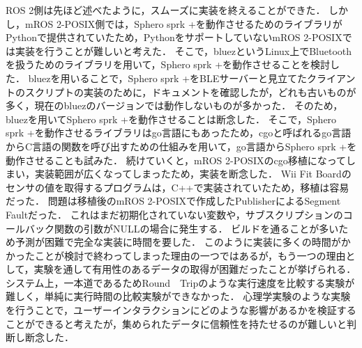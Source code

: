 ROS 2側は先ほど述べたように，スムーズに実装を終えることができた．
しかし，mROS 2-POSIX側では，Sphero sprk +を動作させるためのライブラリがPythonで提供されていたため，PythonをサポートしていないmROS 2-POSIXでは実装を行うことが難しいと考えた．
そこで，bluezというLinux上でBluetoothを扱うためのライブラリを用いて，Sphero sprk +を動作させることを検討した．
bluezを用いることで，Sphero sprk +をBLEサーバーと見立てたクライアントのスクリプトの実装のために，ドキュメントを確認したが，どれも古いものが多く，現在のbluezのバージョンでは動作しないものが多かった．
そのため，bluezを用いてSphero sprk +を動作させることは断念した．
そこで，Sphero sprk +を動作させるライブラリはgo言語にもあったため，cgoと呼ばれるgo言語からC言語の関数を呼び出すための仕組みを用いて，go言語からSphero sprk +を動作させることも試みた．
続けていくと，mROS 2-POSIXのcgo移植になってしまい，実装範囲が広くなってしまったため，実装を断念した．
Wii Fit Boardのセンサの値を取得するプログラムは，C++で実装されていたため，移植は容易だった．
問題は移植後のmROS 2-POSIXで作成したPublisherによるSegment Faultだった．
これはまだ初期化されていない変数や，サブスクリプションのコールバック関数の引数がNULLの場合に発生する．
ビルドを通ることが多いため予測が困難で完全な実装に時間を要した．
このように実装に多くの時間がかかったことが検討で終わってしまった理由の一つではあるが，もう一つの理由として，実験を通して有用性のあるデータの取得が困難だったことが挙げられる．
システム上，一本道であるためRound　Tripのような実行速度を比較する実験が難しく，単純に実行時間の比較実験ができなかった．
心理学実験のような実験を行うことで，ユーザーインタラクションにどのような影響があるかを検証することができると考えたが，集められたデータに信頼性を持たせるのが難しいと判断し断念した．

